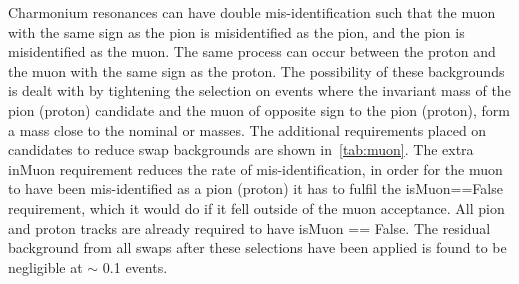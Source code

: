 Charmonium resonances can have double mis-identification such that the muon with the same sign as the pion is misidentified as the pion, and the pion is misidentified as the muon. The same process can occur between the proton and the muon with the same sign as the proton. The possibility of these backgrounds is dealt with by tightening the selection on events where the invariant mass of the pion (proton) candidate and the muon of opposite sign to the pion (proton), form a mass close to the nominal \jpsi or \psitwos masses. The additional requirements placed on \Lbpi candidates to reduce swap backgrounds are shown in~\autoref{tab:muon}. The extra \gls{inMuon} requirement reduces the rate of mis-identification, in order for the muon to have been mis-identified as a pion (proton) it has to fulfil the isMuon==False requirement, which it would do if it fell outside of the muon acceptance.  All pion and proton tracks are already required to have isMuon == False. The residual background from all swaps after these selections have been applied is found to be negligible at $\sim$ 0.1 events.



